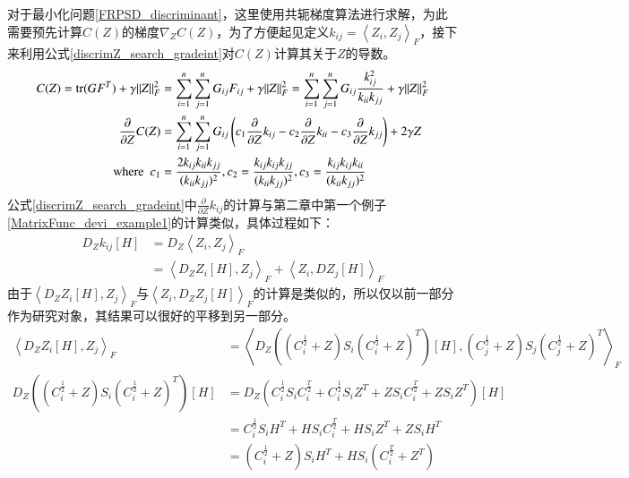 对于最小化问题\ref{FRPSD_discriminant}，这里使用共轭梯度算法进行求解，为此需要预先计算$C(Z)$的梯度$\nabla_{Z}C(Z)$，为了方便起见定义$k_{ij}=\left<Z_{i},Z_{j}\right>_{F}$，接下来利用公式\ref{discrimZ_search_gradeint}对$C(Z)$计算其关于$Z$的导数。
\begin{equation}
\label{discrimZ_search_gradeint}
\begin{split}
C(Z)={\rm tr}(GF^{T})+\gamma\|Z\|_{F}^{2}&=\sum_{i=1}^{n}\sum_{j=1}^{n}G_{ij}F_{ij}+\gamma\|Z\|_{F}^{2}=\sum_{i=1}^{n}\sum_{j=1}^{n}G_{ij}\frac{k_{ij}^2}{k_{ii}k_{jj}}+\gamma\|Z\|_{F}^{2}\\
\frac{\partial}{\partial Z}C(Z)&=\sum_{i=1}^{n}\sum_{j=1}^{n}G_{ij}\left(c_1\frac{\partial}{\partial Z}k_{ij}-c_2\frac{\partial}{\partial Z}k_{ii}-c_3\frac{\partial}{\partial Z}k_{jj}\right)+2\gamma Z\\
{\rm where~~}c_1&=\frac{2k_{ij}k_{ii}k_{jj}}{(k_{ii}k_{jj})^2},c_2=\frac{k_{ij}k_{ij}k_{jj}}{(k_{ii}k_{jj})^2},c_3=\frac{k_{ij}k_{ij}k_{ii}}{(k_{ii}k_{jj})^2}
\end{split}
\end{equation}
公式\ref{discrimZ_search_gradeint}中$\frac{\partial}{\partial Z}k_{ij}$的计算与第二章中第一个例子\ref{MatrixFunc_devi_example1}的计算类似，具体过程如下：
\begin{equation}
\label{discrimZ_search_part1_gradeint}
\begin{split}
D_{Z}k_{ij}[H]&=D_{Z}\left<Z_i,Z_j\right>_{F}\\
&=\left<D_{Z}Z_i[H],Z_j\right>_{F}+\left<Z_i,DZ_j[H]\right>_{F}
\end{split}
\end{equation}
由于$\left<D_{Z}Z_i[H],Z_j\right>_{F}$与$\left<Z_i,D_{Z}Z_j[H]\right>_{F}$的计算是类似的，所以仅以前一部分作为研究对象，其结果可以很好的平移到另一部分。
\begin{equation}
\label{discrimZ_search_part2_gradeint}
\begin{split}
\left<D_{Z}Z_i[H],Z_j\right>_{F}&=\left<D_{Z}\left((C_{i}^{\frac{1}{2}}+Z)S_{i}(C_{i}^{\frac{1}{2}}+Z)^{T}\right)[H],(C_{j}^{\frac{1}{2}}+Z)S_{j}(C_{j}^{\frac{1}{2}}+Z)^{T}\right>_{F}\\
D_{Z}\left((C_{i}^{\frac{1}{2}}+Z)S_{i}(C_{i}^{\frac{1}{2}}+Z)^{T}\right)[H]&=D_{Z}(C_{i}^{\frac{1}{2}}S_{i}C_{i}^{\frac{T}{2}}+C_{i}^{\frac{1}{2}}S_{i}Z^{T}+ZS_{i}C_{i}^{\frac{T}{2}}+ZS_{i}Z^{T})[H]\\
&=C_{i}^{\frac{1}{2}}S_{i}H^{T}+HS_{i}C_{i}^{\frac{T}{2}}+HS_{i}Z^{T}+ZS_{i}H^{T}\\
&=(C_{i}^{\frac{1}{2}}+Z)S_{i}H^{T}+HS_{i}(C_{i}^{\frac{T}{2}}+Z^{T})
\end{split}
\end{equation}

